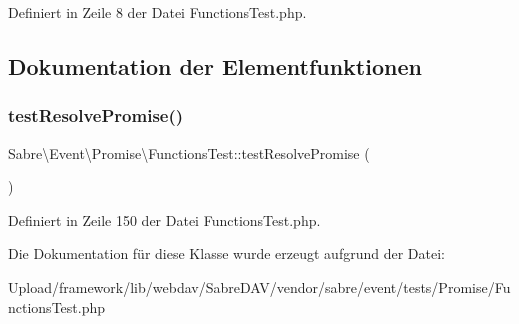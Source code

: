 Definiert in Zeile 8 der Datei Functions\+Test.\+php.



\subsection{Dokumentation der Elementfunktionen}
\mbox{\label{class_sabre_1_1_event_1_1_promise_1_1_functions_test_adc9ef04cbaa105c449a83f51c4e752aa}} 
\subsubsection{\texorpdfstring{test\+Resolve\+Promise()}{testResolvePromise()}}
{\footnotesize\ttfamily Sabre\textbackslash{}\+Event\textbackslash{}\+Promise\textbackslash{}\+Functions\+Test\+::test\+Resolve\+Promise (\begin{DoxyParamCaption}{ }\end{DoxyParamCaption})}



Definiert in Zeile 150 der Datei Functions\+Test.\+php.



Die Dokumentation für diese Klasse wurde erzeugt aufgrund der Datei\+:\begin{DoxyCompactItemize}
\item 
Upload/framework/lib/webdav/\+Sabre\+D\+A\+V/vendor/sabre/event/tests/\+Promise/Functions\+Test.\+php\end{DoxyCompactItemize}
